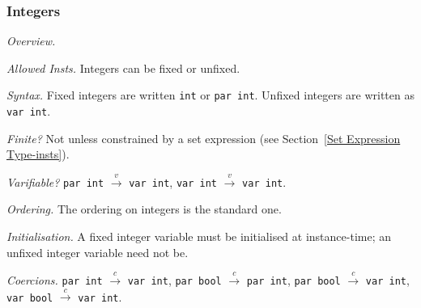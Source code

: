 \documentclass[10pt]{scrartcl}
\newcommand{\TyThing}[1]{\vspace{1.2mm}\noindent\emph{#1} }
\newcommand{\TyOverview}{\TyThing{Overview.}}
\newcommand{\TyInsts}{\TyThing{Allowed Insts.}}
\newcommand{\TySyntax}{\TyThing{Syntax.}}
\newcommand{\TyFiniteType}{\TyThing{Finite?}}
\newcommand{\TyVarifiable}{\TyThing{Varifiable?}}
\newcommand{\TyOrdering}{\TyThing{Ordering.}}
\newcommand{\TyInit}{\TyThing{Initialisation.}}
\newcommand{\TyCoercions}{\TyThing{Coercions.}}
\newcommand{\coerce}[2]{#1 $\stackrel{c}{\rightarrow}$ #2}
\newcommand{\varify}[2]{#1 $\stackrel{v}{\rightarrow}$ #2}
\begin{document}

\subsubsection{Integers}
\label{Integers}
\TyOverview
\CommonIntegersOverview{}

\TyInsts
Integers can be fixed or unfixed.

\TySyntax
Fixed integers are written \texttt{int} or \texttt{par int}.  Unfixed
integers are written as \texttt{var int}.

\TyFiniteType
Not unless constrained by a set expression (see Section~\ref{Set Expression
Type-insts}).

\TyVarifiable
\varify{\texttt{par int}}{\texttt{var int}},
\varify{\texttt{var int}}{\texttt{var int}}.

\TyOrdering
The ordering on integers is the standard one.

\TyInit
A fixed integer variable must be initialised at instance-time;  an unfixed
integer variable need not be.

\TyCoercions
\coerce{\texttt{par int}}{\texttt{var int}},
\coerce{\texttt{par bool}}{\texttt{par int}},
\coerce{\texttt{par bool}}{\texttt{var int}},
\coerce{\texttt{var bool}}{\texttt{var int}}.
\end{document}

